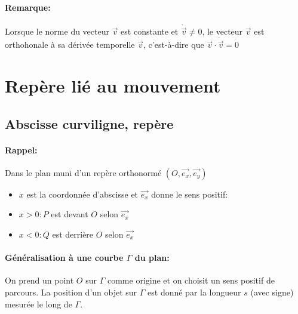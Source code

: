 \documentclass[
    11pt,
    a4paper,
    oneside,
    headinlcude, footinclude,
    twoside,
]{report}
\renewcommand{\vec}[1]{\overrightarrow{#1}}
\begin{document}
\paragraph{Remarque:}
Lorsque le norme du vecteur $\vec v$ est constante et $\dot{\vec v} \neq 0$, le
vecteur $\vec v$ est orthohonale à sa dérivée temporelle $\dot{\vec v}$,
c'est-à-dire que $\vec v \cdot \dot{\vec v}=0$ 


\section{Repère lié au mouvement}

\subsection{Abscisse curviligne, repère}

\paragraph{Rappel:}
\label{par:rappel_}

Dans le plan muni d'un repère orthonormé $(O, \vec{e_{x}}, \vec{e_{y}})$

\begin{center}
    \begin{minipage}{.5\linewidth}
    \end{minipage}
    \begin{minipage}{.49\linewidth}
        \setlength{\parskip}{.3em}
        \begin{itemize}
            \item $x$ est la coordonnée d'abscisse et $\vec{e_{x}}$ donne le
                sens positif:
            \item $x > 0 : P$ est devant $O$ selon $\vec{e_{x}}$
            \item $x < 0: Q$ est derrière $O$ selon $\vec{e_{x}}$
        \end{itemize}
    \end{minipage}
\end{center}


\paragraph{Généralisation à une courbe $\Gamma$ du plan:}
\label{par:generalisation_a_une_courbe_gamma_du_plan}


On prend un point $O$ sur $\Gamma$ comme origine et on choisit un sens positif
de parcours. La position d'un objet sur $\Gamma$ est donné par la longueur $s$
(avec signe) mesurée le long de $\Gamma$.
\end{document}
